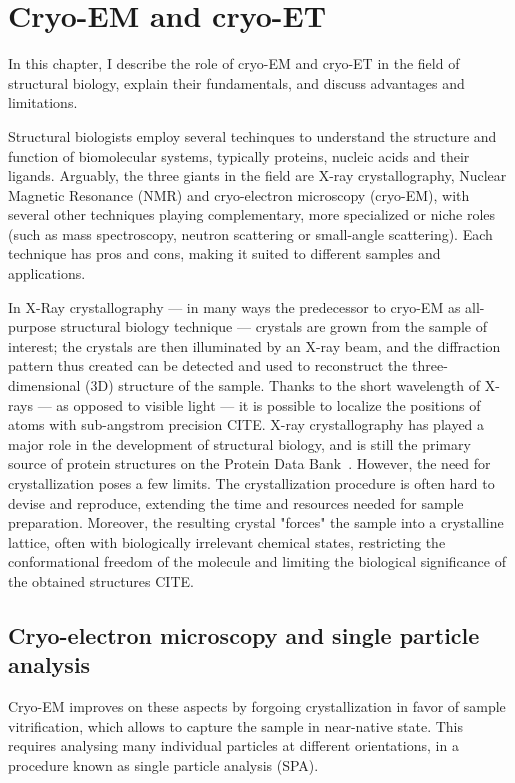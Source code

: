 \chapter{Cryo-EM and cryo-ET}

In this chapter, I describe the role of cryo-EM and cryo-ET in the field of structural biology, explain their fundamentals, and discuss advantages and limitations.

Structural biologists employ several techinques to understand the structure and function of biomolecular systems, typically proteins, nucleic acids and their ligands.
Arguably, the three giants in the field are X-ray crystallography, Nuclear Magnetic Resonance (NMR) and cryo-electron microscopy (cryo-EM), with several other techniques playing complementary, more specialized or niche roles (such as mass spectroscopy, neutron scattering or small-angle scattering).
Each technique has pros and cons, making it suited to different samples and applications.

In X-Ray crystallography --- in many ways the predecessor to cryo-EM as all-purpose structural biology technique --- crystals are grown from the sample of interest; the crystals are then illuminated by an X-ray beam, and the diffraction pattern thus created can be detected and used to reconstruct the three-dimensional (3D) structure of the sample.
Thanks to the short wavelength of X-rays --- as opposed to visible light --- it is possible to localize the positions of atoms with sub-angstrom precision CITE.
X-ray crystallography has played a major role in the development of structural biology, and is still the primary source of protein structures on the Protein Data Bank~\cite{bermanProteinDataBank2000,bermanAnnouncingWorldwideProtein2003}.
However, the need for crystallization poses a few limits.
The crystallization procedure is often hard to devise and reproduce, extending the time and resources needed for sample preparation.
Moreover, the resulting crystal "forces" the sample into a crystalline lattice, often with biologically irrelevant chemical states, restricting the conformational freedom of the molecule and limiting the biological significance of the obtained structures CITE.

\section[Cryo-EM and SPA]{Cryo-electron microscopy and single particle analysis}

Cryo-EM improves on these aspects by forgoing crystallization in favor of sample vitrification, which allows to capture the sample in near-native state. This requires analysing many individual particles at different orientations, in a procedure known as single particle analysis (SPA).

